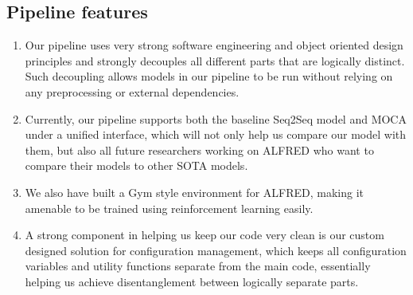 \documentclass[11pt,a4paper]{article}
\begin{document}
\subsection{Pipeline features}
\label{app:code}

\begin{enumerate}
    \item Our pipeline uses very strong software engineering and object oriented design principles and strongly decouples all different parts that are logically distinct. Such decoupling allows models in our pipeline to be run without relying on any preprocessing or external dependencies.
    \item Currently, our pipeline supports both the baseline Seq2Seq model and MOCA under a unified interface, which will not only help us compare our model with them, but also all future researchers working on ALFRED who want to compare their models to other SOTA models.
    \item We also have built a Gym style \cite{brockman2016openai} environment for ALFRED, making it amenable to be trained using reinforcement learning easily.
    \item A strong component in helping us keep our code very clean is our custom designed solution for configuration management, which keeps all configuration variables and utility functions separate from the main code, essentially helping us achieve disentanglement between logically separate parts.
\end{enumerate}
\end{document}
